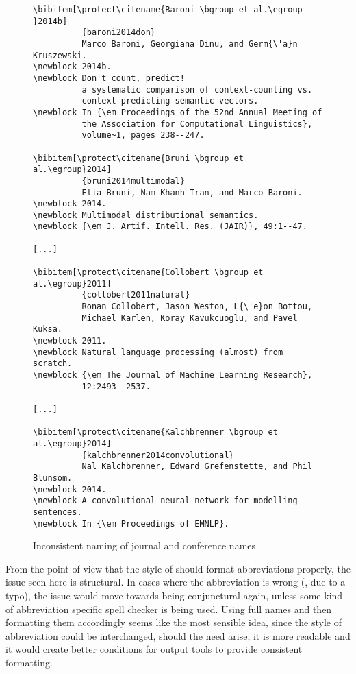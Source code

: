 \begin{figure}
  \centering
\begin{small}
\begin{verbatim}
\bibitem[\protect\citename{Baroni \bgroup et al.\egroup }2014b]
          {baroni2014don}
          Marco Baroni, Georgiana Dinu, and Germ{\'a}n Kruszewski.
\newblock 2014b.
\newblock Don't count, predict!
          a systematic comparison of context-counting vs.
          context-predicting semantic vectors.
\newblock In {\em Proceedings of the 52nd Annual Meeting of
          the Association for Computational Linguistics},
          volume~1, pages 238--247.

\bibitem[\protect\citename{Bruni \bgroup et al.\egroup}2014]
          {bruni2014multimodal}
          Elia Bruni, Nam-Khanh Tran, and Marco Baroni.
\newblock 2014.
\newblock Multimodal distributional semantics.
\newblock {\em J. Artif. Intell. Res. (JAIR)}, 49:1--47.

[...]

\bibitem[\protect\citename{Collobert \bgroup et al.\egroup}2011]
          {collobert2011natural}
          Ronan Collobert, Jason Weston, L{\'e}on Bottou,
          Michael Karlen, Koray Kavukcuoglu, and Pavel Kuksa.
\newblock 2011.
\newblock Natural language processing (almost) from scratch.
\newblock {\em The Journal of Machine Learning Research},
          12:2493--2537.

[...]

\bibitem[\protect\citename{Kalchbrenner \bgroup et al.\egroup}2014]
          {kalchbrenner2014convolutional}
          Nal Kalchbrenner, Edward Grefenstette, and Phil Blunsom.
\newblock 2014.
\newblock A convolutional neural network for modelling sentences.
\newblock In {\em Proceedings of EMNLP}.
\end{verbatim}
\end{small}
  \caption{Inconsistent naming of journal and conference names}
\label{fig:inconsistent_naming}
\end{figure}

From the point of view that the style of {\bibtex} should format
abbreviations properly, the issue seen here is structural.  In cases
where the abbreviation is wrong (\eg, due to a typo), the issue would
move towards being conjunctural again, unless some kind of
abbreviation specific spell checker is being used.  Using full names
and then formatting them accordingly seems like the most sensible
idea, since the style of abbreviation could be interchanged, should
the need arise, it is more readable and it would create better
conditions for output tools to provide consistent formatting.

